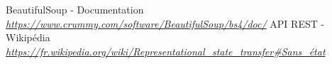 \documentclass[10pt]{article}
\begin{document}
\begin{thebibliography}{}
    \newline
    \newline
    \label{beautifulsoup}
    BeautifulSoup - Documentation\newline
    \href{https://www.crummy.com/software/BeautifulSoup/bs4/doc/}{\textit{https://www.crummy.com/software/BeautifulSoup/bs4/doc/}}
    \newline
    \newline
    \label{api_rest_session}
    API REST - Wikipédia \newline
    \href{https://fr.wikipedia.org/wiki/Representational_state_transfer#Sans_état}{\textit{https://fr.wikipedia.org/wiki/Representational\_state\_transfer\#Sans\_état}}
    
  \end{thebibliography}
  
\end{document}
